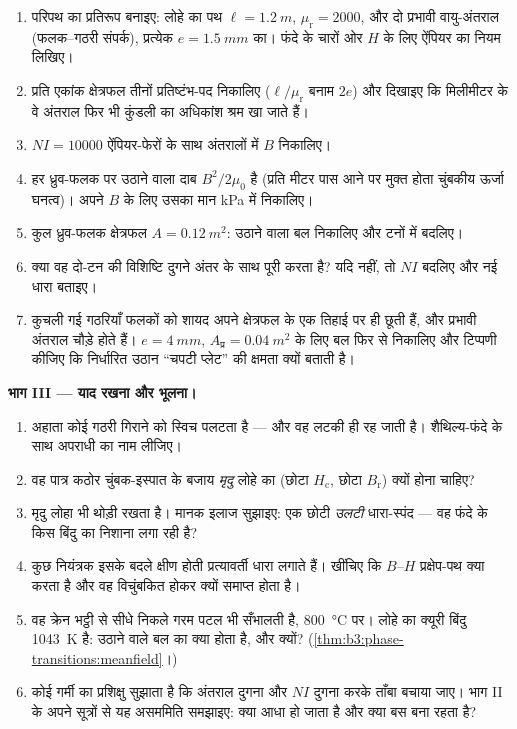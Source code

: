 \begin{problem}
\begin{enumerate}[resume]
  \item परिपथ का प्रतिरूप बनाइए: लोहे का पथ $\ell = \qty{1.2}{m}$,
        $\mu_{\text{r}} = 2000$, और दो प्रभावी वायु-अंतराल
        (फलक--गठरी संपर्क), प्रत्येक $e = \qty{1.5}{mm}$ का। फंदे के
        चारों ओर $H$ के लिए ऐंपियर का नियम लिखिए।
  \item प्रति एकांक क्षेत्रफल तीनों प्रतिष्टंभ-पद निकालिए
        ($\ell/\mu_{\text{r}}$ बनाम $2e$) और दिखाइए कि मिलीमीटर के
        वे अंतराल फिर भी कुंडली का अधिकांश श्रम खा जाते हैं।
  \item $NI = \num{10000}$ ऐंपियर-फेरों के साथ अंतरालों में $B$
        निकालिए।
  \item हर ध्रुव-फलक पर उठाने वाला दाब $B^2/2\mu_0$ है (प्रति मीटर
        पास आने पर मुक्त होता चुंबकीय ऊर्जा घनत्व)।
        अपने $B$ के लिए उसका मान \unit{kPa} में निकालिए।
  \item कुल ध्रुव-फलक क्षेत्रफल $A = \qty{0.12}{m^2}$: उठाने वाला
        बल निकालिए और टनों में बदलिए।
  \item क्या वह दो-टन की विशिष्टि दुगने अंतर के साथ पूरी करता है?
        यदि नहीं, तो $NI$ बदलिए और नई धारा बताइए।
  \item कुचली गई गठरियाँ फलकों को शायद अपने क्षेत्रफल के एक तिहाई
        पर ही छूती हैं, और प्रभावी अंतराल चौड़े होते हैं।
        $e = \qty{4}{mm}$, $A_{\text{प्र}} = \qty{0.04}{m^2}$ के लिए
        बल फिर से निकालिए और टिप्पणी कीजिए कि निर्धारित उठान
        ``चपटी प्लेट'' की क्षमता क्यों बताती है।
\end{enumerate}

\medskip\noindent\textbf{भाग III --- याद रखना और भूलना।}

\begin{enumerate}[resume]
  \item अहाता कोई गठरी गिराने को स्विच पलटता है --- और वह लटकी ही
        रह जाती है। शैथिल्य-फंदे के साथ अपराधी का नाम लीजिए।
  \item वह पात्र कठोर चुंबक-इस्पात के बजाय \emph{मृदु} लोहे का
        (छोटा $H_{\text{c}}$, छोटा $B_{\text{r}}$) क्यों होना
        चाहिए?
  \item मृदु लोहा भी थोड़ी  रखता है। मानक इलाज सुझाइए: एक
        छोटी \emph{उलटी} धारा-स्पंद --- वह फंदे के किस बिंदु का
        निशाना लगा रही है?
  \item कुछ नियंत्रक इसके बदले क्षीण होती प्रत्यावर्ती धारा लगाते
        हैं। खींचिए कि $B$--$H$ प्रक्षेप-पथ क्या करता है और वह
        विचुंबकित होकर क्यों समाप्त होता है।
  \item वह क्रेन भट्ठी से सीधे निकले गरम पटल भी सँभालती है,
        \qty{800}{\celsius} पर। लोहे का क्यूरी बिंदु
        \qty{1043}{K} है: उठाने वाले बल का क्या होता है, और क्यों?
        (\cref{thm:b3:phase-transitions:meanfield}।)
  \item कोई गर्मी का प्रशिक्षु सुझाता है कि अंतराल दुगना और $NI$
        दुगना करके ताँबा बचाया जाए। भाग II के अपने सूत्रों से यह
        असममिति समझाइए: क्या आधा हो जाता है और क्या बस बना रहता है?
\end{enumerate}


\end{problem}
